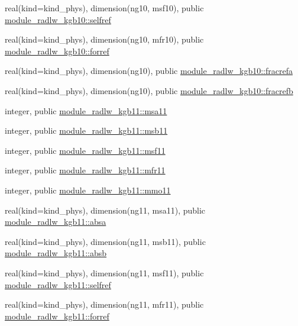 \begin{DoxyCompactItemize}
\item 
real(kind=kind\+\_\+phys), dimension(ng10, msf10), public \hyperlink{namespacemodule__radlw__kgb10_a48247dea283a611ebe57dd1c164dda69}{module\+\_\+radlw\+\_\+kgb10\+::selfref}
\item 
real(kind=kind\+\_\+phys), dimension(ng10, mfr10), public \hyperlink{namespacemodule__radlw__kgb10_af70e39048d571053790289549dd8333a}{module\+\_\+radlw\+\_\+kgb10\+::forref}
\item 
real(kind=kind\+\_\+phys), dimension(ng10), public \hyperlink{namespacemodule__radlw__kgb10_aa8bbfdaf370e12ae26d2ee3c464bdbc2}{module\+\_\+radlw\+\_\+kgb10\+::fracrefa}
\item 
real(kind=kind\+\_\+phys), dimension(ng10), public \hyperlink{namespacemodule__radlw__kgb10_a07d5bac00d30f1ab873a0542b28d7e83}{module\+\_\+radlw\+\_\+kgb10\+::fracrefb}
\item 
integer, public \hyperlink{namespacemodule__radlw__kgb11_afd15a7b87b3d49c53c12e023c604b360}{module\+\_\+radlw\+\_\+kgb11\+::msa11}
\item 
integer, public \hyperlink{namespacemodule__radlw__kgb11_aa8630868015cb7e358107e6418e35276}{module\+\_\+radlw\+\_\+kgb11\+::msb11}
\item 
integer, public \hyperlink{namespacemodule__radlw__kgb11_a7dcec9b9f19a3f5f13d443572d834628}{module\+\_\+radlw\+\_\+kgb11\+::msf11}
\item 
integer, public \hyperlink{namespacemodule__radlw__kgb11_a9b5764441999cce52bc02e65a24420b9}{module\+\_\+radlw\+\_\+kgb11\+::mfr11}
\item 
integer, public \hyperlink{namespacemodule__radlw__kgb11_a6aabd24aa785ef8689c63b01aaaab243}{module\+\_\+radlw\+\_\+kgb11\+::mmo11}
\item 
real(kind=kind\+\_\+phys), dimension(ng11, msa11), public \hyperlink{namespacemodule__radlw__kgb11_a7ac883387aa86a635c9aea011c55a1d5}{module\+\_\+radlw\+\_\+kgb11\+::absa}
\item 
real(kind=kind\+\_\+phys), dimension(ng11, msb11), public \hyperlink{namespacemodule__radlw__kgb11_acf37465675961812e07616e42b137d70}{module\+\_\+radlw\+\_\+kgb11\+::absb}
\item 
real(kind=kind\+\_\+phys), dimension(ng11, msf11), public \hyperlink{namespacemodule__radlw__kgb11_ac98edefcce668d56c3aadc241863741f}{module\+\_\+radlw\+\_\+kgb11\+::selfref}
\item 
real(kind=kind\+\_\+phys), dimension(ng11, mfr11), public \hyperlink{namespacemodule__radlw__kgb11_a9239d06fcd3fca0f13302c1ae4eb5a60}{module\+\_\+radlw\+\_\+kgb11\+::forref}

\end{DoxyCompactItemize}
